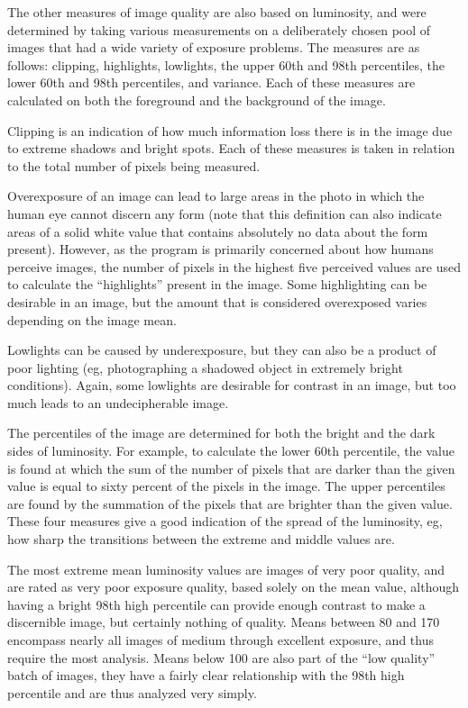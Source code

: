 \documentclass[twocolumn]{article}
\begin{document}
The other measures of image quality are also based on luminosity, and were determined by taking various measurements on a deliberately chosen pool of images that had a wide variety of exposure problems. The measures are as follows: clipping, highlights, lowlights, the upper 60th and 98th percentiles, the lower 60th and 98th percentiles, and variance. Each of these measures are calculated on both the foreground and the background of the image.

Clipping is an indication of how much information loss there is in the image due to extreme shadows and bright spots. Each of these measures is taken in relation to the total number of pixels being measured.

Overexposure of an image can lead to large areas in the photo in which the human eye cannot discern any form (note that this definition can also indicate areas of a solid white value that contains absolutely no data about the form present). However, as the program is primarily concerned about how humans perceive images, the number of pixels in the highest five perceived values are used to calculate the “highlights” present in the image. Some highlighting can be desirable in an image, but the amount that is considered overexposed varies depending on the image mean.

Lowlights can be caused by underexposure, but they can also be a product of poor lighting (eg, photographing a shadowed object in extremely bright conditions). Again, some lowlights are desirable for contrast in an image, but too much leads to an undecipherable image.

The percentiles of the image are determined for both the bright and the dark sides of luminosity. For example, to calculate the lower 60th percentile, the value is found at which the sum of the number of pixels that are darker than the given value is equal to sixty percent of the pixels in the image. The upper percentiles are found by the summation of the pixels that are brighter than the given value. These four measures give a good indication of the spread of the luminosity, eg, how sharp the transitions between the extreme and middle values are.

The most extreme mean luminosity values are images of very poor quality, and are rated as very poor exposure quality, based solely on the mean value, although having a bright 98th high percentile can provide enough contrast to make a discernible image, but certainly nothing of quality. Means between 80 and 170 encompass nearly all images of medium through excellent exposure, and thus require the most analysis. Means below 100 are also part of the “low quality” batch of images, they have a fairly clear relationship with the 98th high percentile and are thus analyzed very simply.
\end{document}
